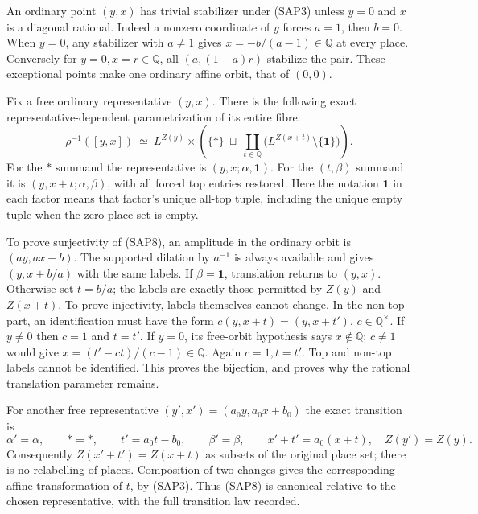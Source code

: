 An ordinary point $(y,x)$ has trivial stabilizer under (SAP3)
unless $y=0$ and $x$ is a diagonal rational. Indeed a nonzero
coordinate of $y$ forces $a=1$, then $b=0$. When $y=0$, any
stabilizer with $a\ne1$ gives $x=-b/(a-1)\in\mathbb Q$ at
every place. Conversely for $y=0,x=r\in\mathbb Q$, all
$(a,(1-a)r)$ stabilize the pair. These exceptional points make
one ordinary affine orbit, that of $(0,0)$.

Fix a free ordinary representative $(y,x)$. There is the following
exact representative-dependent parametrization of its entire fibre:
\begin{equation}\tag{SAP8}
\rho^{-1}([y,x])\ \simeq\
L^{Z(y)}\times
\left(\{*\}\ \sqcup\
\coprod_{t\in\mathbb Q}
       \bigl(L^{Z(x+t)}\setminus\{\boldsymbol1\}\bigr)\right).
\end{equation}
For the $*$ summand the representative is
$(y,x;\alpha,\boldsymbol1)$. For the $(t,\beta)$ summand it is
$(y,x+t;\alpha,\beta)$, with all forced top entries restored.
Here the notation $\boldsymbol1$ in each factor means that
factor's unique all-top tuple, including the unique empty tuple
when the zero-place set is empty.

To prove surjectivity of (SAP8), an amplitude in the ordinary
orbit is $(ay,ax+b)$. The supported dilation by $a^{-1}$ is
always available and gives $(y,x+b/a)$ with the same labels.
If $\beta=\boldsymbol1$, translation returns to $(y,x)$.
Otherwise set $t=b/a$; the labels are exactly those permitted
by $Z(y)$ and $Z(x+t)$. To prove injectivity, labels themselves
cannot change. In the non-top part, an identification must have
the form
$c(y,x+t)=(y,x+t')$, $c\in\mathbb Q^\times$.
If $y\ne0$ then $c=1$ and $t=t'$. If $y=0$, its free-orbit
hypothesis says $x\notin\mathbb Q$; $c\ne1$ would give
$x=(t'-ct)/(c-1)\in\mathbb Q$. Again $c=1,t=t'$.
Top and non-top labels cannot be identified. This proves the
bijection, and proves why the rational translation parameter remains.

For another free representative
$(y',x')=(a_0y,a_0x+b_0)$ the exact transition is
\begin{equation}\tag{SAP9}
\alpha'=\alpha,\qquad *=*,\qquad
t'=a_0t-b_0,\qquad \beta'=\beta,\qquad
x'+t'=a_0(x+t),\quad Z(y')=Z(y).
\end{equation}
Consequently $Z(x'+t')=Z(x+t)$ as subsets of the original place
set; there is no relabelling of places. Composition of two
changes gives the corresponding affine transformation of $t$,
by (SAP3). Thus (SAP8) is canonical relative to the chosen
representative, with the full transition law recorded.

